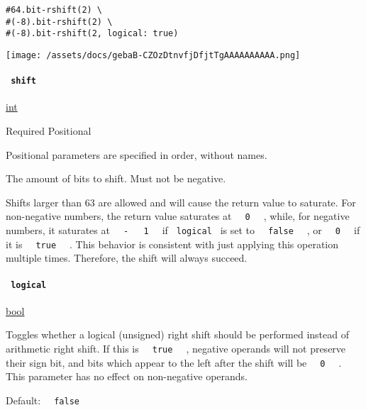 \begin{verbatim}
#64.bit-rshift(2) \
#(-8).bit-rshift(2) \
#(-8).bit-rshift(2, logical: true)
\end{verbatim}

\texttt{[image: /assets/docs/gebaB-CZOzDtnvfjDfjtTgAAAAAAAAAA.png]}

\paragraph{\texorpdfstring{\texttt{\ shift\ }}{ shift }}\label{definitions-bit-rshift-shift}

\href{/docs/reference/foundations/int/}{int}

{Required} {{ Positional }}

\label{definitions-bit-rshift-shift-positional-tooltip}
Positional parameters are specified in order, without names.

The amount of bits to shift. Must not be negative.

Shifts larger than 63 are allowed and will cause the return value to
saturate. For non-negative numbers, the return value saturates at
\texttt{\ }{\texttt{\ 0\ }}\texttt{\ } , while, for negative numbers, it
saturates at
\texttt{\ }{\texttt{\ -\ }}\texttt{\ }{\texttt{\ 1\ }}\texttt{\ } if
\texttt{\ logical\ } is set to
\texttt{\ }{\texttt{\ false\ }}\texttt{\ } , or
\texttt{\ }{\texttt{\ 0\ }}\texttt{\ } if it is
\texttt{\ }{\texttt{\ true\ }}\texttt{\ } . This behavior is consistent
with just applying this operation multiple times. Therefore, the shift
will always succeed.

\paragraph{\texorpdfstring{\texttt{\ logical\ }}{ logical }}\label{definitions-bit-rshift-logical}

\href{/docs/reference/foundations/bool/}{bool}

Toggles whether a logical (unsigned) right shift should be performed
instead of arithmetic right shift. If this is
\texttt{\ }{\texttt{\ true\ }}\texttt{\ } , negative operands will not
preserve their sign bit, and bits which appear to the left after the
shift will be \texttt{\ }{\texttt{\ 0\ }}\texttt{\ } . This parameter
has no effect on non-negative operands.

Default: \texttt{\ }{\texttt{\ false\ }}\texttt{\ }

